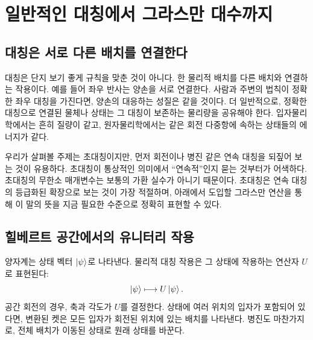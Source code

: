 \chapter{일반적인 대칭에서 그라스만 대수까지}


\section{대칭은 서로 다른 배치를 연결한다}

대칭은 단지 보기 좋게 규칙을 맞춘 것이 아니다. 한 물리적 배치를 다른 배치와 연결하는 작용이다. 예를 들어 좌우 반사는 양손을 서로 연결한다. 사람과 주변의 법칙이 정확한 좌우 대칭을 가진다면, 양손의 대응하는 성질은 같을 것이다. 더 일반적으로, 정확한 대칭으로 연결된 물체나 상태는 그 대칭이 보존하는 물리량을 공유해야 한다. 입자물리학에서는 흔히 질량이 같고, 원자물리학에서는 같은 회전 다중항에 속하는 상태들의 에너지가 같다.

우리가 살펴볼 주제는 초대칭이지만, 먼저 회전이나 병진 같은 연속 대칭을 되짚어 보는 것이 유용하다. 초대칭이 통상적인 의미에서 “연속적”인지 묻는 것부터가 어색하다. 초대칭의 무한소 매개변수는 보통의 가환 실수가 아니기 때문이다. 초대칭은 연속 대칭의 등급화된 확장으로 보는 것이 가장 적절하며, 아래에서 도입할 그라스만 연산을 통해 이 말의 뜻을 지금 필요한 수준으로 정확히 표현할 수 있다. 

\section{힐베르트 공간에서의 유니터리 작용}

양자계는 상태 벡터 \(\left\lvert\psi\right\rangle\)로 나타낸다. 물리적 대칭 작용은 그 상태에 작용하는 연산자 \(U\)로 표현된다:
\begin{equation}
\left\lvert\psi\right\rangle\longmapsto U\left\lvert\psi\right\rangle.
\end{equation}
공간 회전의 경우, 축과 각도가 \(U\)를 결정한다. 상태에 여러 위치의 입자가 포함되어 있다면, 변환된 켓은 모든 입자가 회전된 위치에 있는 배치를 나타낸다. 병진도 마찬가지로, 전체 배치가 이동된 상태로 원래 상태를 바꾼다.

